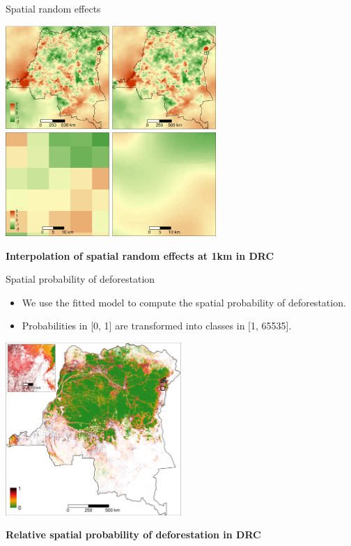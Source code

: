 \documentclass[10pt,table,dvipsnames,compress]{beamer}
\begin{document}
\begin{frame}[label={sec:orge7256cf}]{Spatial random effects}
\begin{center}
\includegraphics[width=0.6\textwidth]{figs/sm/rho.png}
\end{center}

\centering \textbf{Interpolation of spatial random effects at 1km in DRC}
\end{frame}

\begin{frame}[label={sec:org0f0fda3}]{Spatial probability of deforestation}
\begin{itemize}
\item We use the fitted model to compute the spatial probability of deforestation.
\item Probabilities in [0, 1] are transformed into classes in [1, 65535].
\end{itemize}

\begin{center}
\includegraphics[width=0.5\textwidth]{figs/sm/prob.png}
\end{center}

\centering \textbf{Relative spatial probability of deforestation in DRC}
\end{frame}
\end{document}
